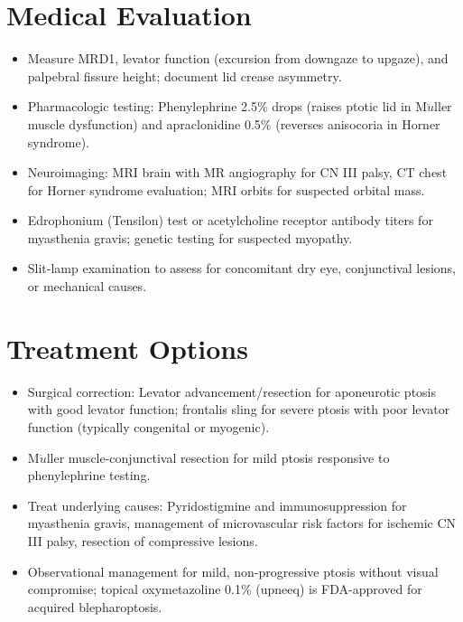 \section*{Medical Evaluation}
\begin{itemize}
  \item Measure MRD1, levator function (excursion from downgaze to upgaze), and palpebral fissure height; document lid crease asymmetry.
  \item Pharmacologic testing: Phenylephrine 2.5\% drops (raises ptotic lid in M$\ddot{u}$ller muscle dysfunction) and apraclonidine 0.5\% (reverses anisocoria in Horner syndrome).
  \item Neuroimaging: MRI brain with MR angiography for CN III palsy, CT chest for Horner syndrome evaluation; MRI orbits for suspected orbital mass.
  \item Edrophonium (Tensilon) test or acetylcholine receptor antibody titers for myasthenia gravis; genetic testing for suspected myopathy.
  \item Slit-lamp examination to assess for concomitant dry eye, conjunctival lesions, or mechanical causes.
\end{itemize}

\section*{Treatment Options}
\begin{itemize}
  \item Surgical correction: Levator advancement/resection for aponeurotic ptosis with good levator function; frontalis sling for severe ptosis with poor levator function (typically congenital or myogenic).
  \item M$\ddot{u}$ller muscle-conjunctival resection for mild ptosis responsive to phenylephrine testing.
  \item Treat underlying causes: Pyridostigmine and immunosuppression for myasthenia gravis, management of microvascular risk factors for ischemic CN III palsy, resection of compressive lesions.
  \item Observational management for mild, non-progressive ptosis without visual compromise; topical oxymetazoline 0.1\% (upneeq) is FDA-approved for acquired blepharoptosis.
\end{itemize}

